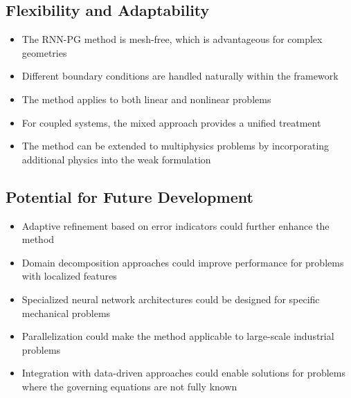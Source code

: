 \documentclass[11pt,a4paper]{article}
\begin{document}
\subsection{Flexibility and Adaptability}

\begin{itemize}
    \item The RNN-PG method is mesh-free, which is advantageous for complex geometries
    \item Different boundary conditions are handled naturally within the framework
    \item The method applies to both linear and nonlinear problems
    \item For coupled systems, the mixed approach provides a unified treatment
    \item The method can be extended to multiphysics problems by incorporating additional physics into the weak formulation
\end{itemize}

\subsection{Potential for Future Development}

\begin{itemize}
    \item Adaptive refinement based on error indicators could further enhance the method
    \item Domain decomposition approaches could improve performance for problems with localized features
    \item Specialized neural network architectures could be designed for specific mechanical problems
    \item Parallelization could make the method applicable to large-scale industrial problems
    \item Integration with data-driven approaches could enable solutions for problems where the governing equations are not fully known
\end{itemize}
\end{document}
